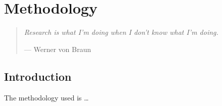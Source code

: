 %
%
%
%

\chapter{Methodology}\label{C.Methodology}

\begin{quote}
\textit{Research is what I'm doing when I don't know what I'm doing.} 

--- Werner von Braun
\end{quote}

\section{Introduction}\label{S.Ch4.opening}

The methodology used is \ldots
